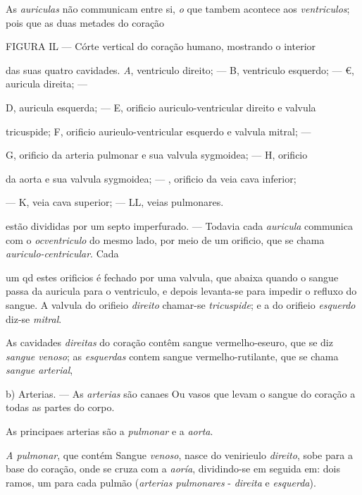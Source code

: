 As \emph{auriculas} não communicam entre si, \emph{o} que tambem acontece aos \emph{ventriculos}; pois que as duas metades do coração

FIGURA IL --- Córte vertical do coração humano, mostrando o interior

das suas quatro cavidades. \emph{A}, ventriculo direito; --- B, ventriculo esquerdo; --- €, auricula direita; ---

D, auricula esquerda; --- E, orificio auriculo-ventricular direito e valvula

tricuspide; F, orificio aurieulo-ventricular esquerdo e valvula mitral; ---

G, orificio da arteria pulmonar e sua valvula sygmoidea; --- H, orificio

da aorta e sua valvula sygmoidea; --- \textbar{}, orificio da veia cava inferior;

--- K, veia cava superior; --- LL, veias pulmonares.

estão divididas por um septo imperfurado. --- Todavia cada \emph{auricula} communica com o \emph{ocventriculo} do mesmo lado, por meio de um orificio, que se chama \emph{auriculo-centricular}. Cada

um qd estes orificios é fechado por uma valvula, que abaixa quando o sangue passa da auricula para o ventriculo, e depois levanta-se para impedir o refluxo do sangue. A valvula do orifieio \emph{direito} chamar-se \emph{tricuspide}; e a do orifieio \emph{esquerdo} diz-se \emph{mitral}.

As cavidades \emph{direitas} do coração contêm sangue vermelho-eseuro, que se diz \emph{sangue venoso}; as \emph{esquerdas} contem sangue vermelho-rutilante, que se chama \emph{sangue arterial},

b) Arterias. --- As \emph{arterias} são canaes Ou vasos que levam o sangue do coração a todas as partes do corpo.

As principaes arterias são a \emph{pulmonar} e a \emph{aorta}.

\emph{A pulmonar}, que contém Sangue \emph{venoso}, nasce do venirieulo \emph{direito}, sobe para a base do coração, onde se cruza com a \emph{aoría}, dividindo-se em seguida em: dois ramos, um para cada pulmão (\emph{arterias pulmonares} - \emph{direita} e \emph{esquerda}).

